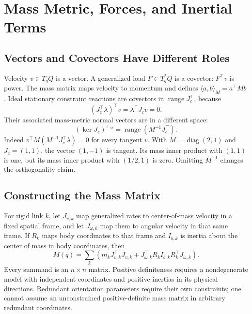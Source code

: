 \section{Mass Metric, Forces, and Inertial Terms}
\label{sec:ch9:lagrangian}

\subsection{Vectors and Covectors Have Different Roles}

Velocity $v\in T_qQ$ is a vector. A generalized load $F\in T_q^*Q$ is a covector: $F^\top v$ is power. The mass matrix maps velocity to momentum and defines $\langle a,b\rangle_M=a^\top Mb$. Ideal stationary constraint reactions are covectors in $\operatorname{range}J_c^\top$, because
\begin{equation}
 (J_c^\top\lambda)^\top v=\lambda^\top J_cv=0.
\end{equation}
Their associated mass-metric normal vectors are in a different space:
\begin{equation}
 (\ker J_c)^{\perp_M}=\operatorname{range}(M^{-1}J_c^\top).
 \label{eq:ch9:orthogonal-complement}
\end{equation}
Indeed $v^\top M(M^{-1}J_c^\top\lambda)=0$ for every tangent $v$. With $M=\operatorname{diag}(2,1)$ and $J_c=(1,1)$, the vector $(1,-1)$ is tangent. Its mass inner product with $(1,1)$ is one, but its mass inner product with $(1/2,1)$ is zero. Omitting $M^{-1}$ changes the orthogonality claim.

\subsection{Constructing the Mass Matrix}

For rigid link $k$, let $J_{v,k}$ map generalized rates to center-of-mass velocity in a fixed spatial frame, and let $J_{\omega,k}$ map them to angular velocity in that same frame. If $R_k$ maps body coordinates to that frame and $I_{b,k}$ is inertia about the center of mass in body coordinates, then
\begin{equation}
 M(q)=\sum_k\left(m_kJ_{v,k}^\top J_{v,k}+J_{\omega,k}^\top R_kI_{b,k}R_k^\top J_{\omega,k}\right).
\end{equation}
Every summand is an $n\times n$ matrix. Positive definiteness requires a nondegenerate model with independent coordinates and positive inertias in its physical directions. Redundant orientation parameters require their own constraints; one cannot assume an unconstrained positive-definite mass matrix in arbitrary redundant coordinates.

